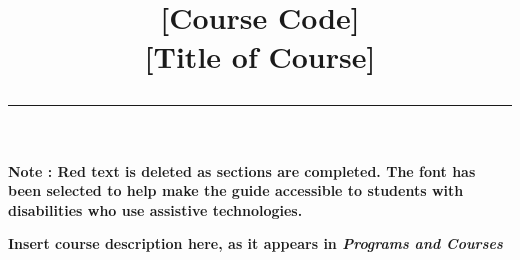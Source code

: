 \documentclass[11pt]{article}
\title{\bfseries \LARGE  [Course Code] \\
	\Huge [Title of Course] \hrule height 3pt \vspace{-2cm}}
\date{}
\author{}
\begin{document}
\setlength{\parindent}{0cm}

\textbf{{\color{red}\small Note : Red text is deleted as sections are completed. The font has been selected to help make the guide accessible to students with disabilities who use assistive technologies. \vspace{-1.2cm}}} \\

\begin{minipage}{\textwidth}
	\begingroup
	\let\center\flushleft
	\let\endcenter\endflushleft
	\maketitle
	\endgroup
\end{minipage}
\thispagestyle{empty}

\textbf{{\color{red} Insert course description here, as it appears in \textit{Programs and Courses}}}
\end{document}
